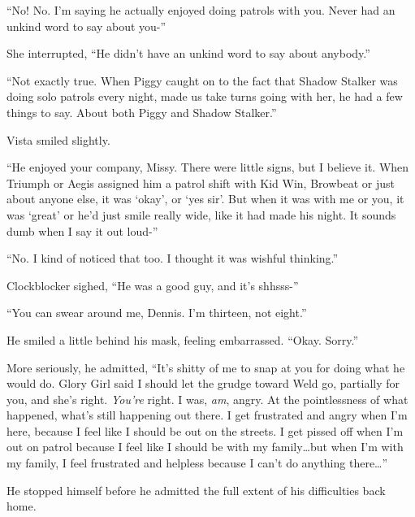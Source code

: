``No!  No.  I'm saying he actually enjoyed doing patrols with you.  Never had an unkind word to say about you-''



She interrupted, ``He didn't have an unkind word to say about anybody.''



``Not exactly true.  When Piggy caught on to the fact that Shadow Stalker was doing solo patrols every night, made us take turns going with her, he had a few things to say.  About both Piggy and Shadow Stalker.''



Vista smiled slightly.



``He enjoyed your company, Missy.  There were little signs, but I believe it.  When Triumph or Aegis assigned him a patrol shift with Kid Win, Browbeat or just about anyone else, it was `okay', or `yes sir'.  But when it was with me or you, it was `great' or he'd just smile really wide, like it had made his night.  It sounds dumb when I say it out loud-''



``No. I kind of noticed that too.  I thought it was wishful thinking.''



Clockblocker sighed, ``He was a good guy, and it's shhsss\ldotsucky-''



``You can swear around me, Dennis.  I'm thirteen, not eight.''



He smiled a little behind his mask, feeling embarrassed.  ``Okay.  Sorry.''



More seriously, he admitted, ``It's shitty of me to snap at you for doing what he would do.  Glory Girl said I should let the grudge toward Weld go, partially for you, and she's right.  \emph{You're} right.  I was, \emph{am}, angry.  At the pointlessness of what happened, what's still happening out there.  I get frustrated and angry when I'm here, because I feel like I should be out on the streets.  I get pissed off when I'm out on patrol because I feel like I should be with my family\ldots but when I'm with my family, I feel frustrated and helpless because I can't do anything there\ldots''



He stopped himself before he admitted the full extent of his difficulties back home.




